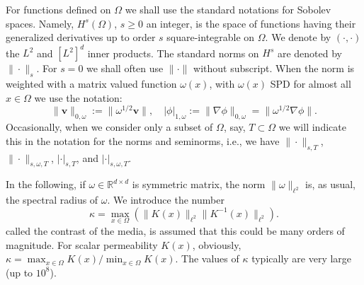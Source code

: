 \documentclass[11pt]{amsart}
\numberwithin{equation}{section}
\theoremstyle{definition}\newtheorem{example}{Example}[section]
\begin{document}
For functions defined on ${{\Omega}}$ we shall use the standard notations for
Sobolev spaces.  Namely, $H^s({{\Omega}})$, $s \ge 0$ an integer, is the
space of functions having their generalized derivatives up to order
$s$ square-integrable on ${{\Omega}}$.  We denote by $(\cdot,\cdot)$ the
$L^2$ and $[L^2]^d$ inner products. 
The standard norms on $H^s$ are denoted by $\|\cdot\|_{s}$. 
For $s=0$ we shall often use $\|\cdot\|$ without subscript. 
When the
norm is weighted with a matrix valued function $\omega(x)$,
with $\omega(x)$ SPD for almost all $x\in \Omega$ we use the
notation:
\[
\|{{\mathbf v}}\|_{0,\omega} := 
\|\omega^{1/2}{{\mathbf v}}\|, \quad
|\phi|_{1,\omega}:= \|\nabla \phi\|_{0,\omega} =\|\omega^{1/2}\nabla \phi\|.
\]
Occasionally, when we consider only a subset of $\Omega$, say,
$T\subset \Omega$ we will indicate this in the notation for the norms
and seminorms, i.e., we have $\|\cdot\|_{s,T}$,
$\|\cdot\|_{s,\omega,T}$, $|\cdot|_{s,T}$, and $|\cdot|_{s,\omega,T}$.

In the following, if $\omega\in \mathbb{R}^{d\times d}$ is symmetric matrix,
the norm $\|\omega\|_{\ell^2}$ is, as usual, the spectral radius of
$\omega$.  
We introduce the number 
\begin{equation}\label{contrast}
\kappa = \max_{x \in \Omega} (\|K(x)\|_{\ell^2}\|K^{-1}(x)\|_{\ell^2}). 
\end{equation}
called the contrast of the media, is assumed that this could be many
orders of magnitude.  For scalar permeability $K(x)$, obviously,
$\kappa = \max_{x \in {{\Omega}}}K(x)/\min_{x \in {{\Omega}}}K(x)$.  
The values of $\kappa$ typically are very large (up to $10^8$). 
\end{document}

